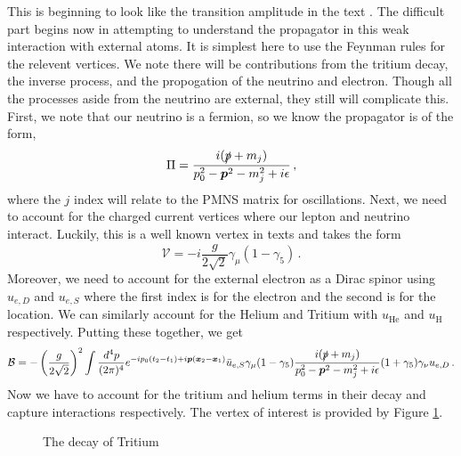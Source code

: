 \documentclass[10pt]{article}
\begin{document}
This is beginning to look like the transition amplitude in the text \cite{Akhmedov_2008}. The difficult part begins now in attempting to understand the propagator in this weak interaction with external atoms. It is simplest here to use the Feynman rules for the relevent vertices. We note there will be contributions from the tritium decay, the inverse process, and the propogation of the neutrino and electron. Though all the processes aside from the neutrino are external, they still will complicate this. First, we note that our neutrino is a fermion, so we know the propagator is of the form,
\begin{equation}
  \Pi = \frac{i(\slashed{p} + m_j)}{p_{0}^{2}-\bm{p}^{2} - m_{j}^{2} + i\epsilon}\, ,
\end{equation}
where the $j$ index will relate to the PMNS matrix for oscillations. Next, we need to account for the charged current vertices where our lepton and neutrino interact. Luckily, this is a well known vertex in texts \cite{ew_lec} and takes the form
\begin{equation}
  \mathcal{V} = -i\frac{g}{2\sqrt{2}}\gamma_{\mu}(1 - \gamma_{5}) \, .
\end{equation}
Moreover, we need to account for the external electron as a Dirac spinor using $u_{e,D}$ and $u_{e,S}$ where the first index is for the electron and the second is for the location. We can similarly account for the Helium and Tritium with $u_{\text{He}}$ and $u_{\text{H}}$ respectively. Putting these together, we get
\begin{equation}
  \mathcal{B} = -\left(\frac{g}{2\sqrt{2}}\right)^{2}\int \frac{d^{4}p}{(2\pi)^{4}}e^{-ip_{0}(t_{2} - t_{1}) + i\bm{p}(\bm{x}_{2} - \bm{x}_{1})}\bar{u}_{e,S}\gamma_{\mu}(1-\gamma_{5})\frac{i(\slashed{p} + m_j)}{p_{0}^{2}-\bm{p}^{2} - m_{j}^{2} + i\epsilon}(1 + \gamma_{5})\gamma_{\nu}u_{e,D} \, .
\end{equation}
Now we have to account for the tritium and helium terms in their decay and capture interactions respectively. The vertex of interest is provided by Figure \ref{fig:decay}.

\begin{figure}[h]
  \centering
    \caption{The decay of Tritium}
    \label{fig:decay}
\end{figure}



\newpage
%



\end{document}
